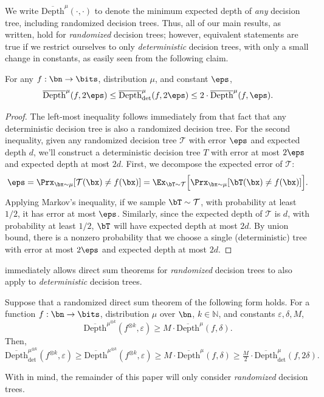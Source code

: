 \documentclass[11pt]{article}
\newcommand{\odepthmu}{\overline{\mathrm{Depth}}^\mu}
\newcommand{\mcT}{\mathcal T}
\DeclarePairedDelimiter\bracket{[}{]}
\begin{document}
We write $\overline{\mathrm{Depth}}^{\mu}(\cdot,\cdot)$ to denote the minimum expected depth of \emph{any} decision tree, including randomized decision trees. Thus, all of our main results, as written, hold for \emph{randomized} decision trees; however, equivalent statements are true if we restrict ourselves to only \emph{deterministic} decision trees, with only a small change in constants, as easily seen from the following claim.
\begin{claim}
    \label{claim:connect-det-rand}
    For any $f:\bn \to \bits$, distribution $\mu$, and constant $\eps$,
    \begin{equation*}
         \odepthmu(f,2\eps) \leq \odepthmu_{\det}(f, 2\eps) \leq 2 \cdot \odepthmu(f, \eps).
    \end{equation*}
\end{claim}
\begin{proof}
    The left-most inequality follows immediately from that fact that any deterministic decision tree is also a randomized decision tree. For the second inequality, given any randomized decision tree $\mcT$ with error $\eps$ and expected depth $d$, we'll construct a deterministic decision tree $T$ with error at most $2\eps$ and expected depth at most $2d$. First, we decompose the expected error of $\mcT$:
    \begin{equation*}
        \eps = \Prx_{\bx \sim \mu}[\mcT(\bx) \neq f(\bx)] = \Ex_{\bT \sim \mcT}\bracket[\Big]{\Prx_{\bx \sim \mu}[\bT(\bx) \neq f(\bx)]}.
    \end{equation*}
    Applying Markov's inequality, if we sample $\bT \sim \mcT$, with probability at least $1/2$, it has error at most $\eps$. Similarly, since the expected depth of $\mcT$ is $d$, with probability at least $1/2$, $\bT$ will have expected depth at most $2d$. By union bound, there is a nonzero probability that we choose a single (deterministic) tree with error at most $2\eps$ and expected depth at most $2d$.
\end{proof}
 immediately allows direct sum theorems for \emph{randomized} decision trees to also apply to \emph{deterministic} decision trees.
\begin{corollary}
    \label{cor:rand-to-det-DP}
    Suppose that a randomized direct sum theorem of the following form holds. For a function $f: \bn \to \bits$, distribution $\mu$  over $\bn$,  $k\in \mathbb{N}$, and constants $\varepsilon, \delta, M$,
    \[ \overline{\mathrm{Depth}}^{\mu^{\otimes k}}(f^{\otimes k},\varepsilon) \ge M \cdot \overline{\mathrm{Depth}}^{\mu}(f,\delta).\]
    Then, 
     \[ \overline{\mathrm{Depth}}_{\det}^{\mu^{\otimes k}}(f^{\otimes k},\varepsilon) \geq \overline{\mathrm{Depth}}^{\mu^{\otimes k}}(f^{\otimes k},\varepsilon) \ge M \cdot \overline{\mathrm{Depth}}^{\mu}(f,\delta) \geq  \tfrac{M}2 \cdot \overline{\mathrm{Depth}}^{\mu}_{\mathrm{det}}(f,2\delta).\]
\end{corollary}
With  in mind, the remainder of this paper will only consider \emph{randomized} decision trees.
\end{document}
